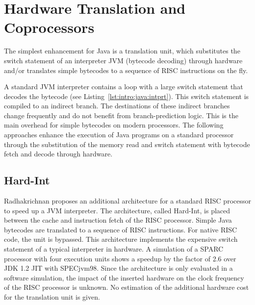 



\section{Hardware Translation and Coprocessors}

The simplest enhancement for Java is a translation unit, which
substitutes the switch statement of an interpreter JVM (bytecode
decoding) through hardware and/or translates simple bytecodes
to a sequence of RISC instructions on the fly.

A standard JVM interpreter contains a loop with a large switch
statement that decodes the bytecode (see
Listing~\ref{lst:intro:java:intprt}). This switch statement is
compiled to an indirect branch. The destinations of these indirect
branches change frequently and do not benefit from branch-prediction
logic. This is the main overhead for simple bytecodes on modern
processors. The following approaches enhance the execution of Java
programs on a standard processor through the substitution of the
memory read and switch statement with bytecode fetch and decode
through hardware.


\subsection{Hard-Int}

Radhakrichnan \cite{HardInt} proposes an additional architecture for
a standard RISC processor to speed up a JVM interpreter. The
architecture, called Hard-Int, is placed between the cache and
instruction fetch of the RISC processor. Simple Java bytecodes are
translated to a sequence of RISC instructions. For native RISC code,
the unit is bypassed. This architecture implements the expensive
switch statement of a typical interpreter in hardware. A simulation
of a SPARC processor with four execution units shows a speedup by
the factor of 2.6 over JDK 1.2 JIT with SPECjvm98. Since the
architecture is only evaluated in a software simulation, the impact
of the inserted hardware on the clock frequency of the RISC
processor is unknown. No estimation of the additional hardware cost
for the translation unit is given.


